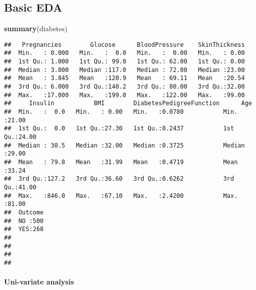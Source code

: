 \documentclass[
]{article}
\newenvironment{Shaded}{\begin{snugshade}}{\end{snugshade}}
\newcommand{\AttributeTok}[1]{\textcolor[rgb]{0.13,0.29,0.53}{#1}}
\newcommand{\CommentTok}[1]{\textcolor[rgb]{0.56,0.35,0.01}{\textit{#1}}}
\newcommand{\DecValTok}[1]{\textcolor[rgb]{0.00,0.00,0.81}{#1}}
\newcommand{\FunctionTok}[1]{\textcolor[rgb]{0.13,0.29,0.53}{\textbf{#1}}}
\newcommand{\NormalTok}[1]{#1}
\newcommand{\OtherTok}[1]{\textcolor[rgb]{0.56,0.35,0.01}{#1}}
\newcommand{\SpecialCharTok}[1]{\textcolor[rgb]{0.81,0.36,0.00}{\textbf{#1}}}
\begin{document}
\hypertarget{basic-eda}{%
\subsection{Basic EDA}\label{basic-eda}}

\begin{Shaded}
\begin{Highlighting}[]
\FunctionTok{summary}\NormalTok{(diabetes)}
\end{Highlighting}
\end{Shaded}

\begin{verbatim}
##   Pregnancies        Glucose      BloodPressure    SkinThickness  
##  Min.   : 0.000   Min.   :  0.0   Min.   :  0.00   Min.   : 0.00  
##  1st Qu.: 1.000   1st Qu.: 99.0   1st Qu.: 62.00   1st Qu.: 0.00  
##  Median : 3.000   Median :117.0   Median : 72.00   Median :23.00  
##  Mean   : 3.845   Mean   :120.9   Mean   : 69.11   Mean   :20.54  
##  3rd Qu.: 6.000   3rd Qu.:140.2   3rd Qu.: 80.00   3rd Qu.:32.00  
##  Max.   :17.000   Max.   :199.0   Max.   :122.00   Max.   :99.00  
##     Insulin           BMI        DiabetesPedigreeFunction      Age       
##  Min.   :  0.0   Min.   : 0.00   Min.   :0.0780           Min.   :21.00  
##  1st Qu.:  0.0   1st Qu.:27.30   1st Qu.:0.2437           1st Qu.:24.00  
##  Median : 30.5   Median :32.00   Median :0.3725           Median :29.00  
##  Mean   : 79.8   Mean   :31.99   Mean   :0.4719           Mean   :33.24  
##  3rd Qu.:127.2   3rd Qu.:36.60   3rd Qu.:0.6262           3rd Qu.:41.00  
##  Max.   :846.0   Max.   :67.10   Max.   :2.4200           Max.   :81.00  
##  Outcome  
##  NO :500  
##  YES:268  
##           
##           
##           
## 
\end{verbatim}

\hypertarget{uni-variate-analysis}{%
\paragraph{\texorpdfstring{\textbf{Uni-variate
analysis}}{Uni-variate analysis}}\label{uni-variate-analysis}}

\begin{Shaded}
\end{Shaded}
\end{document}
